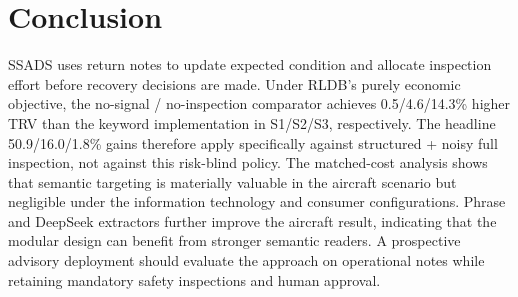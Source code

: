 \documentclass[a4paper,conference]{IEEEtran}
\begin{document}
\section{Conclusion}

SSADS uses return notes to update expected condition and allocate inspection effort
before recovery decisions are made. Under RLDB's purely economic objective, the
no-signal / no-inspection comparator achieves 0.5/4.6/14.3\% higher TRV than the
keyword implementation in S1/S2/S3, respectively. The headline
50.9/16.0/1.8\% gains therefore apply specifically against structured + noisy full
inspection, not against this risk-blind policy. The matched-cost analysis shows that semantic targeting
is materially valuable in the aircraft scenario but negligible under the
information technology and consumer configurations. Phrase and DeepSeek
extractors further improve the aircraft result, indicating that the modular design
can benefit from stronger semantic readers. A prospective advisory deployment
should evaluate the approach on operational notes while retaining mandatory safety
inspections and human approval.
\end{document}
